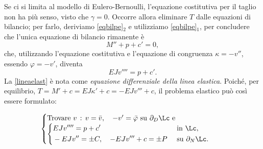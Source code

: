 Se ci si limita al modello di Eulero-Bernoulli, l'equazione costitutiva per il taglio non ha più senso, visto che $\gamma=0$. Occorre allora eliminare $T$ dalle equazioni di bilancio; per farlo, deriviamo \eqref{eqbilpe}$_2$ e utilizziamo \eqref{eqbilpe}$_1$, per concludere che l'unica equazione di bilancio rimanente è
\begin{equation}
M''+p+c'=0,
\end{equation}
che, utilizzando l'equazione costitutiva e l'equazione di congruenza $\kappa=-v''$, essendo $\varphi=-v'$, diventa
	\begin{equation}\label{lineaelast}
EJ v''''=p+c'.
\end{equation}
La \eqref{lineaelast} è nota come \textit{equazione differenziale della linea elastica}.  Poiché, per equilibrio, $T=M'+c=EJ \kappa'+c=-EJ v'''+c$, il problema elastico può  così essere formulato:
\begin{definition}
	\begin{equation}
		\begin{cases}
			\mathrm{Trovare~}{v}\,:\,v=\bar{v},\quad -v'=\bar{\varphi}\mathrm{~su~}\partial_D\Lc\mathrm{~e}\\
			\begin{cases}
				\begin{aligned}
					& EJ v''''=p+c' \quad &&\mathrm{~in~}\Lc,\\
					& -EJv''=\pm C, \quad -EJv'''+c=\pm P &&\mathrm{~su~}\partial_N\Lc.
				\end{aligned}
			\end{cases}
		\end{cases}
	\end{equation}
\end{definition}

